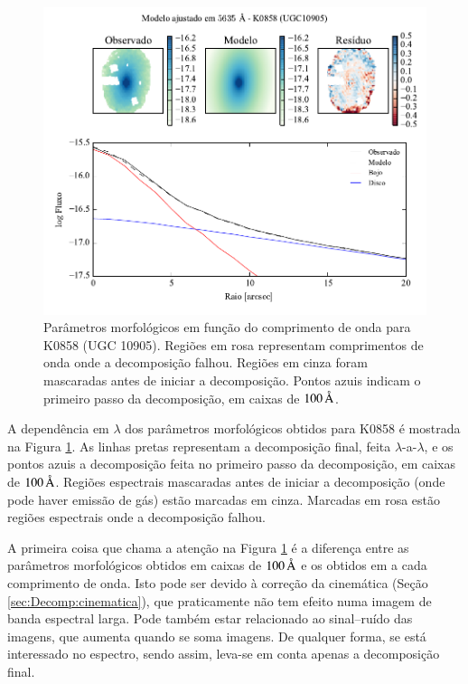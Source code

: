 \begin{figure}
	\includegraphics[page=2]{figuras-decomp/K0858_sample006a}
	\caption[Parâmetros morfológicos em função do comprimento de onda para K0858
	(UGC 10905)]
	{Parâmetros morfológicos em função do comprimento de onda para
	K0858 (UGC 10905). Regiões em rosa representam comprimentos de onda onde a
	decomposição falhou. Regiões em cinza foram mascaradas antes de iniciar a
	decomposição. Pontos azuis indicam o primeiro passo da decomposição, em caixas
	de $100\,\text{\normalfont\AA}$.}
	\label{fig:decompParams}
\end{figure}

A dependência em $\lambda$ dos parâmetros morfológicos obtidos para K0858 é
mostrada na Figura \ref{fig:decompParams}. As linhas pretas representam a
decomposição final, feita $\lambda$-a-$\lambda$, e os pontos azuis a
decomposição feita no primeiro passo da decomposição, em caixas de
$100\,\text{\normalfont\AA}$. Regiões espectrais mascaradas antes de iniciar a decomposição
(onde pode haver emissão de gás) estão marcadas em cinza. Marcadas em rosa estão
regiões espectrais onde a decomposição falhou.

A primeira coisa que chama a atenção na Figura \ref{fig:decompParams} é a
diferença entre as parâmetros morfológicos obtidos em caixas de $100\,\text{\normalfont\AA}$
e os obtidos em a cada comprimento de onda. Isto pode ser devido à correção da
cinemática (Seção \ref{sec:Decomp:cinematica}), que praticamente não tem efeito
numa imagem de banda espectral larga. Pode também estar relacionado ao
sinal--ruído das imagens, que aumenta quando se soma imagens. De qualquer forma,
se está interessado no espectro, sendo assim, leva-se em conta apenas a
decomposição final.

